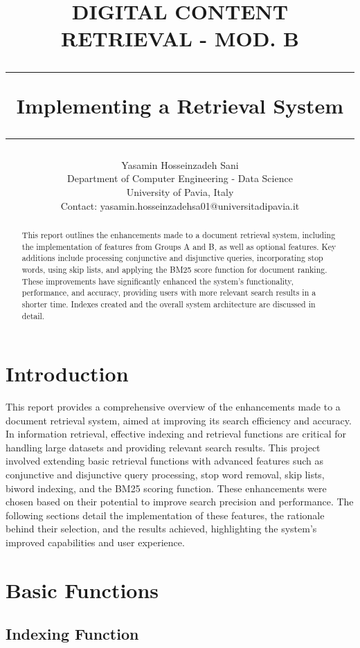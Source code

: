 \documentclass[a4paper,10pt]{article}
\title{\vspace{40mm}\Large {DIGITAL CONTENT RETRIEVAL - MOD. B} \vspace{0.2cm}
     \rule{\textwidth}{0.3pt} \vspace{0.1cm} %
     \textbf{Implementing a Retrieval System} \vspace{0.0cm} %
     \rule{\textwidth}{0.3pt}}
\author{Yasamin Hosseinzadeh Sani \vspace{0.1cm}\\
        \small Department of Computer Engineering - Data Science \vspace{0.2cm}\\
        \small University of Pavia, Italy \vspace{0.2cm}\\
        \small Contact: yasamin.hosseinzadehsa01@universitadipavia.it}
\begin{document}
\maketitle
\vspace{110mm}

\begin{abstract}
This report outlines the enhancements made to a document retrieval system, including the implementation of features from Groups A and B, as well as optional features. Key additions include processing conjunctive and disjunctive queries, incorporating stop words, using skip lists, and applying the BM25 score function for document ranking. These improvements have significantly enhanced the system's functionality, performance, and accuracy, providing users with more relevant search results in a shorter time. Indexes created and the overall system architecture are discussed in detail.
\end{abstract}

\section{Introduction}

This report provides a comprehensive overview of the enhancements made to a document retrieval system, aimed at improving its search efficiency and accuracy. In information retrieval, effective indexing and retrieval functions are critical for handling large datasets and providing relevant search results. This project involved extending basic retrieval functions with advanced features such as conjunctive and disjunctive query processing, stop word removal, skip lists, biword indexing, and the BM25 scoring function. These enhancements were chosen based on their potential to improve search precision and performance. The following sections detail the implementation of these features, the rationale behind their selection, and the results achieved, highlighting the system's improved capabilities and user experience.

\section{Basic Functions}

\subsection{Indexing Function}
\end{document}
